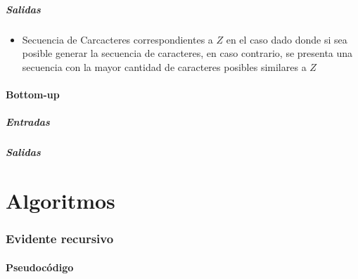 \documentclass[]{article}
\numberwithin{equation}{section}
\numberwithin{figure}{section}
\theoremstyle{definition}
\begin{document}
\subsubsection*{Salidas}

\begin{itemize}

\item Secuencia de Carcacteres correspondientes a $Z$ en el caso dado donde si sea posible generar la secuencia de caracteres, en caso contrario, se presenta una secuencia con la mayor cantidad de caracteres posibles similares a $Z$

\end{itemize}

\subsection*{Bottom-up}

\subsubsection*{Entradas}

\subsubsection*{Salidas}

\part*{Algoritmos}

\section*{Evidente recursivo}
	
	\subsection*{Pseudocódigo}
	
\end{document}
